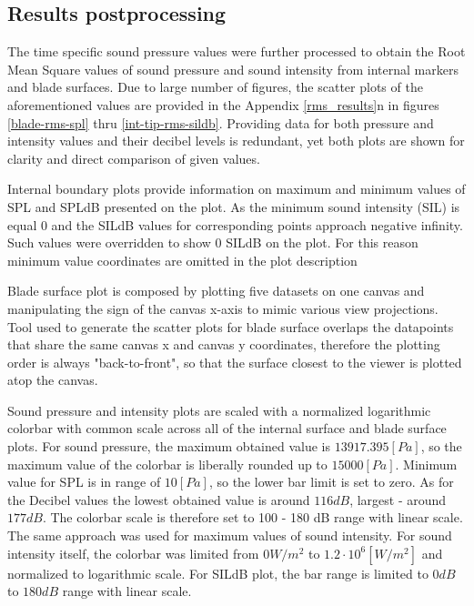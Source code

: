 \subsection{Results postprocessing} \label{rms_res_prep}
The time specific sound pressure values were further processed to obtain the Root Mean Square values of sound pressure and sound intensity from internal markers and blade surfaces. Due to large number of figures, the scatter plots of the aforementioned values are provided in the Appendix \ref{rms_results}n in figures \ref{blade-rms-spl} thru \ref{int-tip-rms-sildb}. Providing data for both pressure and intensity values and their decibel levels is redundant, yet both plots are shown for clarity and direct comparison of given values. 

Internal boundary plots provide information on maximum and minimum values of SPL and SPLdB presented on the plot. As the minimum sound intensity (SIL) is equal 0 and the SILdB values for corresponding points approach negative infinity. Such values were overridden to show 0 SILdB on the plot.    For this reason minimum value coordinates are omitted in the plot description 

Blade surface plot is composed by plotting five datasets on one canvas and manipulating the sign of the canvas x-axis to mimic various view projections. Tool used to generate the scatter plots for blade surface overlaps the datapoints that share the same canvas x and canvas y coordinates, therefore the plotting order is always "back-to-front", so that the surface closest to the viewer is plotted atop the canvas.

Sound pressure and intensity plots are scaled with a normalized logarithmic colorbar with common scale across all of the internal surface and blade surface plots. For sound pressure, the maximum obtained value is $13917.395 [Pa]$, so the maximum value of the colorbar is liberally rounded up to $15000 [Pa]$. Minimum value for SPL is in range of $10 [Pa]$, so the lower bar limit is set to zero. As for the Decibel values the lowest obtained value is around $116 dB$, largest - around $177 dB$. The colorbar scale is therefore set to 100 - 180 dB range with linear scale. The same approach was used for maximum values of sound intensity. For sound intensity itself, the colorbar was limited from $0 W/m^2$ to $1.2 \cdot 10^6 [W/m^2]$ and normalized to logarithmic scale. For SILdB plot, the bar range is limited to $0 dB$ to $180 dB$ range with linear scale. %

